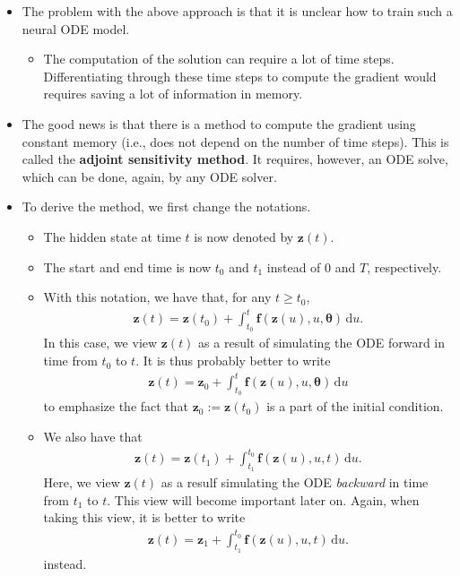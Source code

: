 \documentclass[10pt]{article}
\newcommand{\dee}{\mathrm{d}}
\newcommand{\ve}[1]{\mathbf{#1}}
\newcommand{\ves}[1]{\boldsymbol{#1}}
\begin{document}
\begin{itemize}
  \item The problem with the above approach is that it is unclear how to train such a neural ODE model.
  \begin{itemize}
    \item The computation of the solution can require a lot of time steps. Differentiating through these time steps to compute the gradient would requires saving a lot of information in memory.
  \end{itemize}

  \item The good news is that there is a method to compute the gradient using constant memory (i.e., does not depend on the number of time steps). This is called the {\bf adjoint sensitivity method}. It requires, however, an ODE solve, which can be done, again, by any ODE solver.
  
  \item To derive the method, we first change the notations.
  \begin{itemize}
    \item The hidden state at time $t$ is now denoted by $\ve{z}(t)$.
    
    \item The start and end time is now $t_0$ and $t_1$ instead of $0$ and $T$, respectively.
    
    \item With this notation, we have that, for any $t \geq t_0$,
    \begin{align*}
      \ve{z}(t) = \ve{z}(t_0) + \int_{t_0}^t \ve{f}(\ve{z}(u), u, \ves{\theta})\, \dee u.
    \end{align*}
    In this case, we view $\ve{z}(t)$ as a result of simulating the ODE forward in time from $t_0$ to $t$. It is thus probably better to write 
    \begin{align*}
      \ve{z}(t) = \ve{z}_0 + \int_{t_0}^t \ve{f}(\ve{z}(u), u, \ves{\theta})\, \dee u
    \end{align*}
    to emphasize the fact that $\ve{z}_0 := \ve{z}(t_0)$ is a part of the initial condition.

    \item We also have that
    \begin{align*}
      \ve{z}(t) = \ve{z}(t_1) + \int_{t_1}^{t_0} \ve{f}(\ve{z}(u), u, t)\, \dee u.
    \end{align*}
    Here, we view $\ve{z}(t)$ as a resulf simulating the ODE {\it backward} in time from $t_1$ to $t$. This view will become important later on. Again, when taking this view, it is better to write
    \begin{align*}
      \ve{z}(t) = \ve{z}_1 + \int_{t_1}^{t_0} \ve{f}(\ve{z}(u), u, t)\, \dee u.
    \end{align*}
    instead.
  \end{itemize}


\end{itemize}
\end{document}
